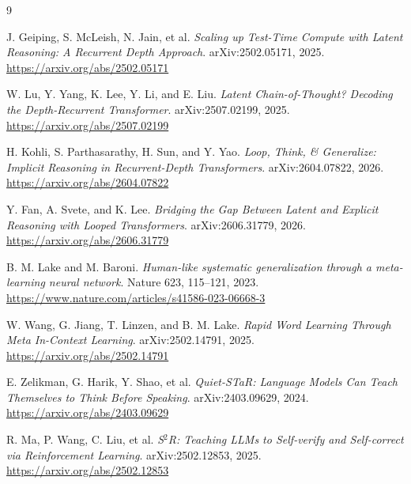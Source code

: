 \documentclass[10pt]{article}
\begin{document}
\begin{thebibliography}{9}

J. Geiping, S. McLeish, N. Jain, et al.
\newblock \emph{Scaling up Test-Time Compute with Latent Reasoning: A Recurrent Depth Approach}.
\newblock arXiv:2502.05171, 2025.
\newblock \url{https://arxiv.org/abs/2502.05171}

W. Lu, Y. Yang, K. Lee, Y. Li, and E. Liu.
\newblock \emph{Latent Chain-of-Thought? Decoding the Depth-Recurrent Transformer}.
\newblock arXiv:2507.02199, 2025.
\newblock \url{https://arxiv.org/abs/2507.02199}

H. Kohli, S. Parthasarathy, H. Sun, and Y. Yao.
\newblock \emph{Loop, Think, \& Generalize: Implicit Reasoning in Recurrent-Depth Transformers}.
\newblock arXiv:2604.07822, 2026.
\newblock \url{https://arxiv.org/abs/2604.07822}

Y. Fan, A. Svete, and K. Lee.
\newblock \emph{Bridging the Gap Between Latent and Explicit Reasoning with Looped Transformers}.
\newblock arXiv:2606.31779, 2026.
\newblock \url{https://arxiv.org/abs/2606.31779}

B. M. Lake and M. Baroni.
\newblock \emph{Human-like systematic generalization through a meta-learning neural network}.
\newblock Nature 623, 115--121, 2023.
\newblock \url{https://www.nature.com/articles/s41586-023-06668-3}

W. Wang, G. Jiang, T. Linzen, and B. M. Lake.
\newblock \emph{Rapid Word Learning Through Meta In-Context Learning}.
\newblock arXiv:2502.14791, 2025.
\newblock \url{https://arxiv.org/abs/2502.14791}

E. Zelikman, G. Harik, Y. Shao, et al.
\newblock \emph{Quiet-STaR: Language Models Can Teach Themselves to Think Before Speaking}.
\newblock arXiv:2403.09629, 2024.
\newblock \url{https://arxiv.org/abs/2403.09629}

R. Ma, P. Wang, C. Liu, et al.
\newblock \emph{S$^2$R: Teaching LLMs to Self-verify and Self-correct via Reinforcement Learning}.
\newblock arXiv:2502.12853, 2025.
\newblock \url{https://arxiv.org/abs/2502.12853}

\end{thebibliography}
\end{document}
